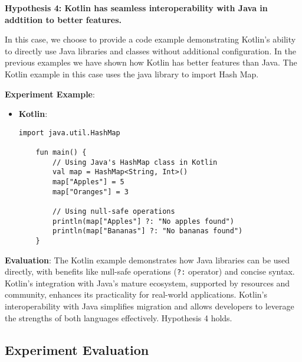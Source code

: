 \noindent \textbf{Hypothesis 4: Kotlin has seamless interoperability with Java in addtition to better features.}

\vspace{1em}

\noindent In this case, we choose to provide a code example demonstrating Kotlin's ability to directly use Java libraries and classes without additional configuration. In the previous examples we have shown how Kotlin has better features than Java. The Kotlin example in this case uses the java library to import Hash Map.

\vspace{1em}

\noindent \textbf{Experiment Example}:

\begin{tcolorbox}[colframe=blue!80!black, colback=blue!5!white, coltitle=blue!50!black, title={-}, boxrule=0.5mm, width=0.8\textwidth, sharp corners=south]
    \begin{itemize}
        \item \textbf{\scriptsize Kotlin}:
        \begin{lstlisting}[style=kotlin, basicstyle=\scriptsize\ttfamily]
    import java.util.HashMap

    fun main() {
        // Using Java's HashMap class in Kotlin
        val map = HashMap<String, Int>()
        map["Apples"] = 5
        map["Oranges"] = 3

        // Using null-safe operations
        println(map["Apples"] ?: "No apples found")
        println(map["Bananas"] ?: "No bananas found")
    }
        \end{lstlisting}
    \end{itemize}
\end{tcolorbox}

\vspace{1em}

\noindent \textbf{Evaluation}: The Kotlin example demonstrates how Java libraries can be used directly, with benefits like null-safe operations (\texttt{?:} operator) and concise syntax. Kotlin's integration with Java's mature ecosystem, supported by resources and community, enhances its practicality for real-world applications.  Kotlin’s interoperability with Java simplifies migration and allows developers to leverage the strengths of both languages effectively. Hypothesis 4 holds. 


\vspace{1em}

\subsection{Experiment Evaluation}


